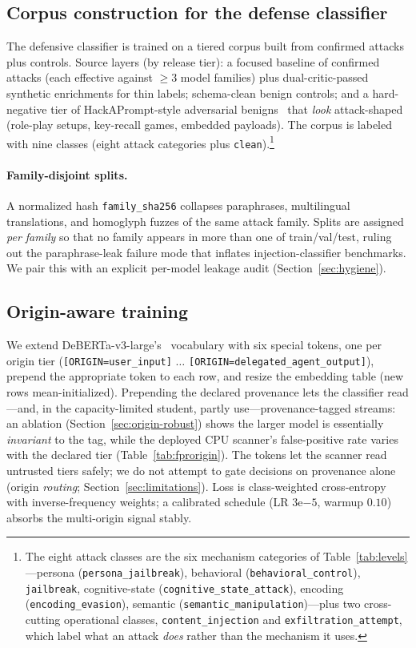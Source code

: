 \documentclass{article}
\begin{document}
\subsection{Corpus construction for the defense classifier}

The defensive classifier is trained on a tiered corpus built from confirmed attacks plus controls. Source layers (by release tier): a focused baseline of confirmed attacks (each effective against $\geq3$ model families) plus dual-critic-passed synthetic enrichments for thin labels; schema-clean benign controls; and a hard-negative tier of HackAPrompt-style adversarial benigns~\citep{schulhoff2023hackaprompt} that \emph{look} attack-shaped (role-play setups, key-recall games, embedded payloads). The corpus is labeled with nine classes (eight attack categories plus \texttt{clean}).\footnote{The eight attack classes are the six mechanism categories of Table~\ref{tab:levels}---persona (\texttt{persona\_jailbreak}), behavioral (\texttt{behavioral\_control}), \texttt{jailbreak}, cognitive-state (\texttt{cognitive\_state\_attack}), encoding (\texttt{encoding\_evasion}), semantic (\texttt{semantic\_manipulation})---plus two cross-cutting operational classes, \texttt{content\_injection} and \texttt{exfiltration\_attempt}, which label what an attack \emph{does} rather than the mechanism it uses.}

\paragraph{Family-disjoint splits.}
A normalized hash \texttt{family\_sha256} collapses paraphrases, multilingual translations, and homoglyph fuzzes of the same attack family. Splits are assigned \emph{per family} so that no family appears in more than one of train/val/test, ruling out the paraphrase-leak failure mode that inflates injection-classifier benchmarks. We pair this with an explicit per-model leakage audit (Section~\ref{sec:hygiene}).

\subsection{Origin-aware training}
\label{sec:benign-coverage}

We extend DeBERTa-v3-large's~\citep{he2021deberta} vocabulary with six special tokens, one per origin tier (\texttt{[ORIGIN=user\_input]} $\ldots$ \texttt{[ORIGIN=delegated\_agent\_output]}), prepend the appropriate token to each row, and resize the embedding table (new rows mean-initialized). Prepending the declared provenance lets the classifier read---and, in the capacity-limited student, partly use---provenance-tagged streams: an ablation (Section~\ref{sec:origin-robust}) shows the larger model is essentially \emph{invariant} to the tag, while the deployed CPU scanner's false-positive rate varies with the declared tier (Table~\ref{tab:fprorigin}). The tokens let the scanner read untrusted tiers safely; we do not attempt to gate decisions on provenance alone (origin \emph{routing}; Section~\ref{sec:limitations}). Loss is class-weighted cross-entropy with inverse-frequency weights; a calibrated schedule (LR $3\mathrm{e}{-5}$, warmup $0.10$) absorbs the multi-origin signal stably.
\end{document}
